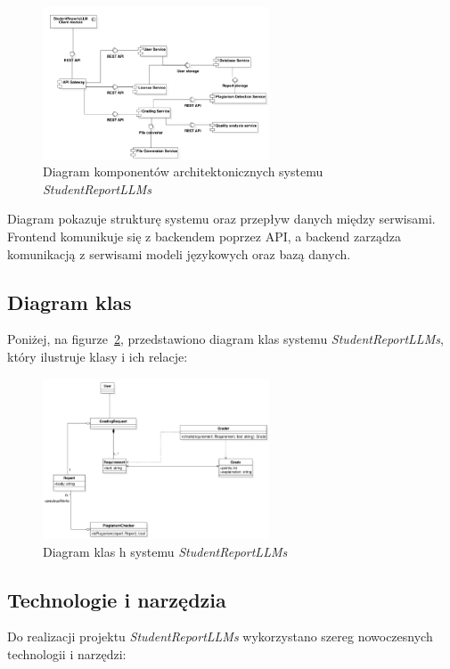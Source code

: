 \documentclass[a4paper, 12pt]{article}
\begin{document}
\begin{figure}[H]
    \centering
    \includegraphics[width=0.6\textwidth]{img/component_diagram}
    \caption{Diagram komponentów architektonicznych systemu \textit{StudentReportLLMs}}
    \label{fig:architecture}
\end{figure}

Diagram pokazuje strukturę systemu oraz przepływ danych między serwisami. Frontend komunikuje się z backendem poprzez API, a backend zarządza komunikacją z serwisami modeli językowych oraz bazą danych.

\subsection*{Diagram klas}
Poniżej, na figurze~\ref{fig:class-diagram}, przedstawiono diagram klas systemu \textit{StudentReportLLMs}, który ilustruje klasy i ich relacje:
\begin{figure}[H]
    \centering
    \includegraphics[width=0.6\textwidth]{img/class_diagram}
    \caption{Diagram klas h systemu \textit{StudentReportLLMs}}
    \label{fig:class-diagram}
\end{figure}

\subsection{Technologie i narzędzia}

Do realizacji projektu \textit{StudentReportLLMs} wykorzystano szereg nowoczesnych technologii i narzędzi:
\end{document}
